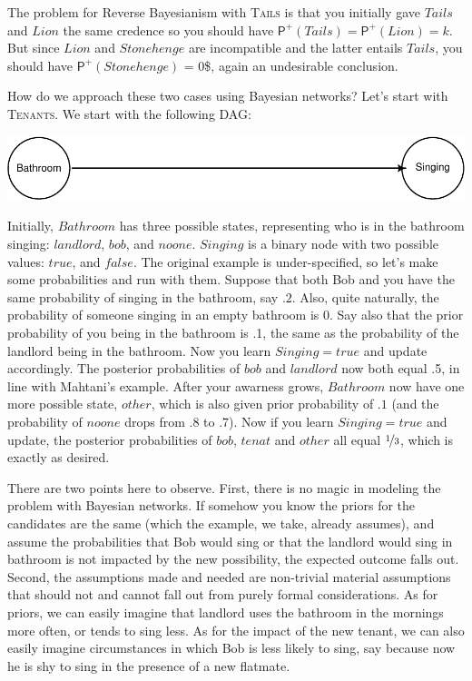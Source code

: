 \documentclass[
  11pt,
  dvipsnames,enabledeprecatedfontcommands]{scrartcl}
\newcommand{\ppr}[2]{\ensuremath{\mathsf{P}^{#1}(#2)}}
\begin{document}
The problem for Reverse Bayesianism with \textsc{Tails} is that you
initially gave \(Tails\) and \(Lion\) the same credence so you should
have \(\ppr{+}{Tails} = \ppr{+}{Lion} = k\). But since \(Lion\) and
\(Stonehenge\) are incompatible and the latter entails \(Tails\), you
should have \ppr{+}{Stonehenge} = 0\$, again an undesirable conclusion.

How do we approach these two cases using Bayesian networks? Let's start
with \textsc{Tenants}. We start with the following DAG:

\begin{center}\includegraphics[width=0.5\linewidth,height=0.3\textheight]{ReplyToSteeleStefansson2_files/figure-latex/tenantsDAG-1} \end{center}

Initially, \(Bathroom\) has three possible states, representing who is
in the bathroom singing: \(landlord\), \(bob\), and \(noone\).
\(Singing\) is a binary node with two possible values: \(true\), and
\(false\). The original example is under-specified, so let's make some
probabilities and run with them. Suppose that both Bob and you have the
same probability of singing in the bathroom, say \(.2\). Also, quite
naturally, the probability of someone singing in an empty bathroom is 0.
Say also that the prior probability of you being in the bathroom is .1,
the same as the probability of the landlord being in the bathroom. Now
you learn \(Singing = true\) and update accordingly. The posterior
probabilities of \(bob\) and \(landlord\) now both equal .5, in line
with Mahtani's example. After your awarness grows, \(Bathroom\) now have
one more possible state, \(other\), which is also given prior
probability of \(.1\) (and the probability of \(noone\) drops from .8 to
.7). Now if you learn \(Singing = true\) and update, the posterior
probabilities of \(bob\), \(tenat\) and \(other\) all equal
\(\nicefrac{1}{3}\), which is exactly as desired.

There are two points here to observe. First, there is no magic in
modeling the problem with Bayesian networks. If somehow you know the
priors for the candidates are the same (which the example, we take,
already assumes), and assume the probabilities that Bob would sing or
that the landlord would sing in bathroom is not impacted by the new
possibility, the expected outcome falls out. Second, the assumptions
made and needed are non-trivial material assumptions that should not and
cannot fall out from purely formal considerations. As for priors, we can
easily imagine that landlord uses the bathroom in the mornings more
often, or tends to sing less. As for the impact of the new tenant, we
can also easily imagine circumstances in which Bob is less likely to
sing, say because now he is shy to sing in the presence of a new
flatmate.
\end{document}
